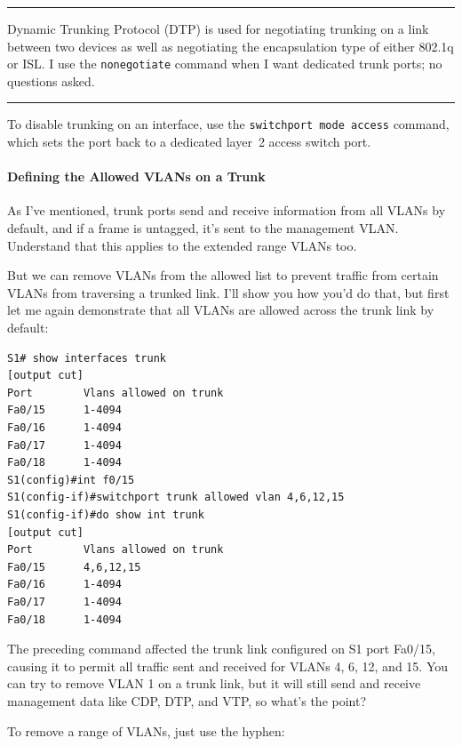 \documentclass[b5paper,11pt]{memoir}
\begin{document}
\begin{center}\rule{0.5\linewidth}{0.5pt}\end{center}

Dynamic Trunking Protocol (DTP) is used
for negotiating trunking on a link between two devices as well as
negotiating the encapsulation type of either 802.1q or ISL. I use the
\texttt{nonegotiate} command when I want dedicated trunk ports; no
questions asked.

\begin{center}\rule{0.5\linewidth}{0.5pt}\end{center}

To disable trunking on an interface, use the
\texttt{switchport\ mode\ access} command, which sets the port back to a
dedicated layer~2 access switch port.

\paragraph{Defining the Allowed VLANs on a Trunk}

As I've mentioned, trunk ports send and receive information from all
VLANs by default, and if a frame is untagged, it's sent to the
management VLAN. Understand that this applies to the extended range
VLANs too.

But we can remove VLANs from the allowed list to prevent traffic from
certain VLANs from traversing a trunked link. I'll show you how you'd do
that, but first let me again demonstrate that all VLANs are allowed
across the trunk link by default:

\begin{verbatim}
S1# show interfaces trunk
[output cut]
Port        Vlans allowed on trunk
Fa0/15      1-4094
Fa0/16      1-4094
Fa0/17      1-4094
Fa0/18      1-4094
S1(config)#int f0/15
S1(config-if)#switchport trunk allowed vlan 4,6,12,15
S1(config-if)#do show int trunk
[output cut]
Port        Vlans allowed on trunk
Fa0/15      4,6,12,15
Fa0/16      1-4094
Fa0/17      1-4094
Fa0/18      1-4094
\end{verbatim}

The preceding command
affected the trunk link configured on S1 port Fa0/15, causing it to
permit all traffic sent and received for VLANs 4, 6, 12, and 15. You can
try to remove VLAN 1 on a trunk link, but it will still send and receive
management data like CDP, DTP, and VTP, so what's the point?

To remove a range of VLANs, just use the hyphen:
\end{document}
